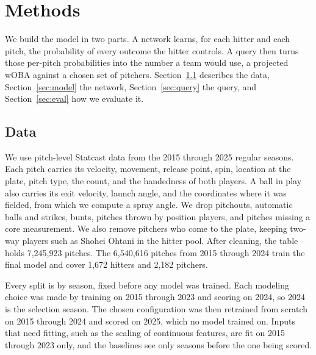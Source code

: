 \documentclass[11pt,letterpaper]{article}
\begin{document}
\section{Methods}
\label{sec:methods}

We build the model in two parts. A network learns, for each hitter and each pitch, the probability of every outcome the hitter controls. A query then turns those per-pitch probabilities into the number a team would use, a projected wOBA against a chosen set of pitchers. Section~\ref{sec:data} describes the data, Section~\ref{sec:model} the network, Section~\ref{sec:query} the query, and Section~\ref{sec:eval} how we evaluate it.

\subsection{Data}
\label{sec:data}

We use pitch-level Statcast data from the 2015 through 2025 regular seasons. Each pitch carries its velocity, movement, release point, spin, location at the plate, pitch type, the count, and the handedness of both players. A ball in play also carries its exit velocity, launch angle, and the coordinates where it was fielded, from which we compute a spray angle. We drop pitchouts, automatic balls and strikes, bunts, pitches thrown by position players, and pitches missing a core measurement. We also remove pitchers who come to the plate, keeping two-way players such as Shohei Ohtani in the hitter pool. After cleaning, the table holds 7,245,923 pitches. The 6,540,616 pitches from 2015 through 2024 train the final model and cover 1,672 hitters and 2,182 pitchers.

Every split is by season, fixed before any model was trained. Each modeling choice was made by training on 2015 through 2023 and scoring on 2024, so 2024 is the selection season. The chosen configuration was then retrained from scratch on 2015 through 2024 and scored on 2025, which no model trained on. Inputs that need fitting, such as the scaling of continuous features, are fit on 2015 through 2023 only, and the baselines see only seasons before the one being scored.
\end{document}
